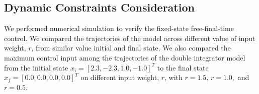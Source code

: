 \documentclass[conference]{IEEEtran}
\begin{document}
\subsection{Dynamic Constraints Consideration}
We performed numerical simulation to verify the fixed-state free-final-time control. We compared the trajectories of the model across different value of input weight, $r$, from similar value initial and final state. We also compared the maximum control input among the trajectories of the double integrator model from the initial state $x_i=[2.3, -2.3, 1.0, -1.0]^{T}$ to the final state $x_f=[0.0, 0.0, 0.0, 0.0]^{T}$ on different input weight, $r$, with $r=1.5, \, r=1.0,$ and $r=0.5$.
\end{document}
